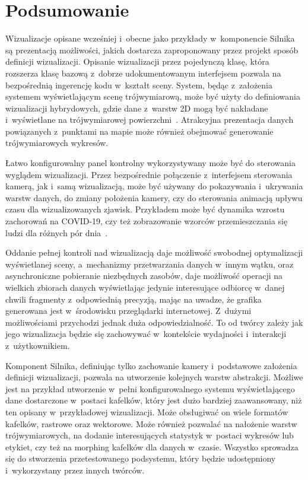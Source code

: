 \section{Podsumowanie}

Wizualizacje opisane wcześniej i~obecne jako przykłady w~komponencie Silnika są prezentacją możliwości, jakich dostarcza zaproponowany przez projekt sposób definicji wizualizacji. Opisanie wizualizacji przez pojedynczą klasę, która rozszerza klasę bazową z~dobrze udokumentowanym interfejsem pozwala na bezpośrednią ingerencję kodu w~kształt sceny. System, będąc z~założenia systemem wyświetlającym scenę trójwymiarową, może być użyty do definiowania wizualizacji hybrydowych, gdzie dane z~warstw 2D mogą być nakładane i~wyświetlane na trójwymiarowej powierzchni~\cite{Hybrid}. Atrakcyjna prezentacja danych powiązanych z~punktami na mapie może również obejmować generowanie trójwymiarowych wykresów.

Łatwo konfigurowalny panel kontrolny wykorzystywany może być do sterowania wyglądem wizualizacji. Przez bezpośrednie połączenie z~interfejsem sterowania kamerą, jak i~samą wizualizacją, może być używany do pokazywania i~ukrywania warstw danych, do zmiany położenia kamery, czy do sterowania animacją upływu czasu dla wizualizowanych zjawisk. Przykładem może być dynamika wzrostu zachorowań na COVID-19, czy też zobrazowanie wzorców przemieszczania się ludzi dla różnych pór dnia~\cite{Kwan}.

Oddanie pełnej kontroli nad wizualizacją daje możliwość swobodnej optymalizacji wyświetlanej sceny, a~mechanizmy przetwarzania danych w~innym wątku, oraz asynchroniczne pobieranie niezbędnych zasobów, daje możliwość operacji na wielkich zbiorach danych wyświetlając jedynie interesujące odbiorcę w~danej chwili fragmenty z~odpowiednią precyzją, mając na uwadze, że grafika generowana jest w~środowisku przeglądarki internetowej. Z~dużymi możliwościami przychodzi jednak duża odpowiedzialność. To od twórcy zależy jak jego wizualizacja będzie się zachowywać w~kontekście wydajności i~interakcji z~użytkownikiem.

Komponent Silnika, definiując tylko zachowanie kamery i~podstawowe założenia definicji wizualizacji, pozwala na utworzenie kolejnych warstw abstrakcji. Możliwe jest na przykład utworzenie w~pełni konfigurowalnego systemu wyświetlającego dane dostarczone w~postaci kafelków, który jest dużo bardziej zaawansowany, niż ten opisany w~przykładowej wizualizacji. Może obsługiwać on wiele formatów kafelków, rastrowe oraz wektorowe. Może również pozwalać na nałożenie warstw trójwymiarowych, na dodanie interesujących statystyk w~postaci wykresów lub etykiet, czy też na morphing kafelków dla danych w~czasie. Wszystko sprowadza się do stworzenia przetestowanego podsystemu, który będzie udostępniony i~wykorzystany przez innych twórców. 
